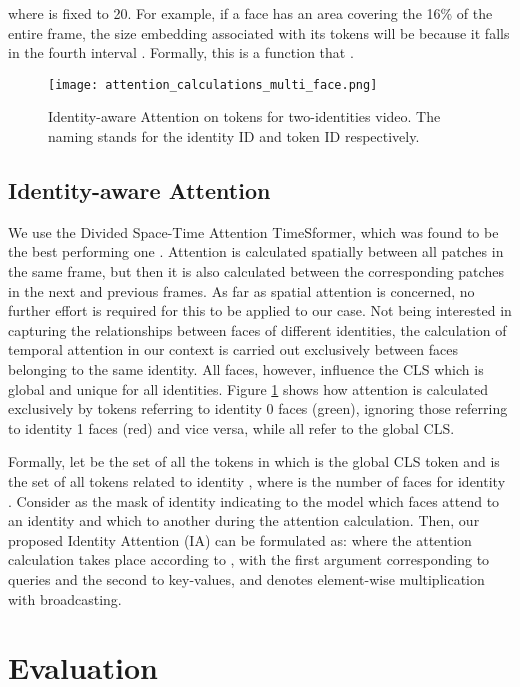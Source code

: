 \documentclass[10pt,twocolumn,letterpaper]{article}
\begin{document}
where  is fixed to 20. 
For example, if a face has an area covering the 16\% of the entire frame, the size embedding associated with its tokens will be  because it falls in the fourth interval . 
Formally, this is a function  that .
\begin{figure}[t]
    \centering
    \texttt{[image: attention\_calculations\_multi\_face.png]}
    \caption{Identity-aware Attention on tokens for two-identities video. The naming  stands for the identity ID and token ID respectively.}
    \label{fig:attention}
\end{figure}

\subsection{Identity-aware Attention}
We use the Divided Space-Time Attention TimeSformer, which was found to be the best performing one \cite{Bertasius2021IsSA}. Attention is calculated spatially between all patches in the same frame, but then it is also calculated between the corresponding patches in the next and previous frames. As far as spatial attention is concerned, no further effort is required for this to be applied to our case. Not being interested in capturing the relationships between faces of different identities, the calculation of temporal attention in our context is carried out exclusively between faces belonging to the same identity.
All faces, however, influence the CLS which is global and unique for all identities. 
Figure \ref{fig:attention} shows how attention is calculated exclusively by tokens referring to identity 0 faces (green), ignoring those referring to identity 1 faces (red) and vice versa, while all refer to the global CLS.

Formally, let  be the set of all the tokens in which  is the global CLS token and  is the set of all tokens related to identity , where  is the number of faces for identity . Consider  as the mask of identity  indicating to the model which faces attend to an identity and which to another during the attention calculation.
Then, our proposed Identity Attention (IA) can be formulated as: 
where the attention calculation 
takes place according to \cite{Bertasius2021IsSA}, 
with the first argument corresponding to queries and the second to key-values, and  denotes element-wise multiplication with broadcasting. 


\section{Evaluation}
\end{document}
